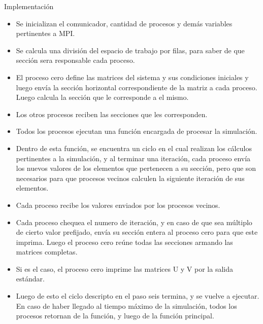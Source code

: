 \begin{section}{Implementación}
\begin{itemize}
\item Se inicializan el comunicador, cantidad de procesos y demás variables pertinentes a MPI.
\item Se calcula una división del espacio de trabajo por filas, para saber de que sección sera responsable cada proceso.
\item El proceso cero define las matrices del sistema y sus condiciones iniciales y luego envía la sección horizontal correspondiente de la matriz a cada proceso. Luego calcula la sección que le corresponde a el mismo.
\item Los otros procesos reciben las secciones que les corresponden.
\item Todos los procesos ejecutan una función encargada de procesar la simulación.
\item Dentro de esta función, se encuentra un ciclo en el cual realizan los cálculos pertinentes a la simulación, y al terminar una iteración, cada proceso envía los nuevos valores de los elementos que pertenecen a su sección, pero que son necesarios para que procesos vecinos calculen la siguiente iteración de sus elementos.
\item Cada proceso recibe los valores enviados por los procesos vecinos.
\item Cada proceso chequea el numero de iteración, y en caso de que sea múltiplo de cierto valor prefijado, envía su sección entera al proceso cero para que este imprima. Luego el proceso cero reúne todas las secciones armando las matrices completas.
\item Si es el caso, el proceso cero imprime las matrices U y V por la salida estándar.
\item Luego de esto el ciclo descripto en el paso seis termina, y se vuelve a ejecutar. En caso de haber llegado al tiempo máximo de la simulación, todos los procesos retornan de la función, y luego de la función principal.
~\\
~\\
\end{itemize}




\end{section}
